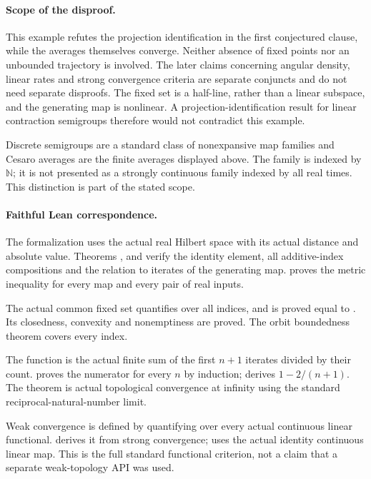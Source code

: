 \documentclass[11pt]{article}
\begin{document}
\newpage
\paragraph{Scope of the disproof.}
This example refutes the projection identification in the first conjectured clause, while the averages themselves converge. Neither absence of fixed points nor an unbounded trajectory is involved. The later claims concerning angular density, linear rates and strong convergence criteria are separate conjuncts and do not need separate disproofs. The fixed set is a half-line, rather than a linear subspace, and the generating map is nonlinear. A projection-identification result for linear contraction semigroups therefore would not contradict this example.

Discrete semigroups are a standard class of nonexpansive map families and Cesaro averages are the finite averages displayed above. The family is indexed by $\mathbb N$; it is not presented as a strongly continuous family indexed by all real times. This distinction is part of the stated scope.

\paragraph{Faithful Lean correspondence.}
The formalization uses the actual real Hilbert space with its actual distance and absolute value. Theorems ,  and  verify the identity element, all additive-index compositions and the relation to iterates of the generating map.  proves the metric inequality for every map and every pair of real inputs.

The actual common fixed set quantifies over all indices, and is proved equal to . Its closedness, convexity and nonemptiness are proved. The orbit boundedness theorem covers every index.

The function  is the actual finite sum of the first $n+1$ iterates divided by their count.  proves the numerator for every $n$ by induction;  derives $1-2/(n+1)$. The theorem  is actual topological convergence at infinity using the standard reciprocal-natural-number limit.

Weak convergence is defined by quantifying over every actual continuous linear functional.  derives it from strong convergence;  uses the actual identity continuous linear map. This is the full standard functional criterion, not a claim that a separate weak-topology API was used.
\end{document}
